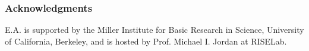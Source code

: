 \documentclass[aoas,preprint]{imsart}
\begin{document}
\tableofcontents















\subsubsection*{Acknowledgments}

E.A. is supported by the Miller Institute for Basic Research in Science,
University of California, Berkeley, and is hosted by Prof. Michael I. Jordan
at RISELab.



\end{document}
